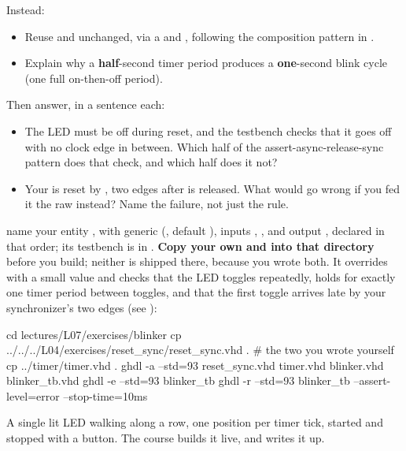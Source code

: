 Instead:
\begin{itemize}
  \item Reuse  and  unchanged, via a  and
    , following the composition pattern in .
  \item Explain why a \textbf{half}-second timer period produces a \textbf{one}-second blink cycle
    (one full on-then-off period).
\end{itemize}
Then answer, in a sentence each:
\begin{itemize}
  \item The LED must be off during reset, and the testbench checks that it goes off with no clock
    edge in between. Which half of the assert-async-release-sync pattern does that check, and which
    half does it not?
  \item Your  is reset by , two edges after  is
    released. What would go wrong if you fed it the raw  instead? Name the failure,
    not just the rule.
\end{itemize}


\selfcheck name your entity , with generic  (, default
), inputs , , and output , declared in that
order; its testbench is in . \textbf{Copy your own 
and  into that directory} before you build; neither is shipped there, because you
wrote both. It overrides  with a small value and checks that the LED toggles
repeatedly, holds for exactly one timer period between toggles, and that the first toggle arrives
late by your synchronizer's two edges (see ):

\begin{shell}
cd lectures/L07/exercises/blinker
cp ../../../L04/exercises/reset_sync/reset_sync.vhd .   # the two you wrote yourself
cp ../timer/timer.vhd .
ghdl -a --std=93 reset_sync.vhd timer.vhd blinker.vhd blinker_tb.vhd
ghdl -e --std=93 blinker_tb
ghdl -r --std=93 blinker_tb --assert-level=error --stop-time=10ms
\end{shell}

\label{c7:set:3}

A single lit LED walking along a row, one position per timer tick, started and stopped with a
button. The course builds it live, and  writes it up.

